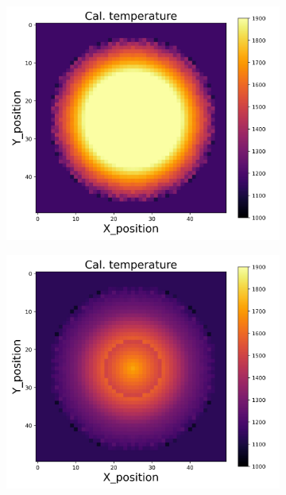 {\begin{figure}[p]
\begin{minipage}{\textwidth}
\begin{subfigure}{0.325\textwidth}
        \end{subfigure}
    \end{minipage}\\
    \begin{minipage}{\textwidth}
        \centering
        \begin{subfigure}{0.325\textwidth}
            \centering
            \includegraphics[width=\textwidth]{figures/raw_data/32/lin_square/T_cal.jpg}
        \end{subfigure}
        \begin{subfigure}{0.325\textwidth}
            \centering
            \includegraphics[width=\textwidth]{figures/raw_data/33/lin_square/T_cal.jpg}

\end{subfigure}
\end{minipage}
\end{figure}}
